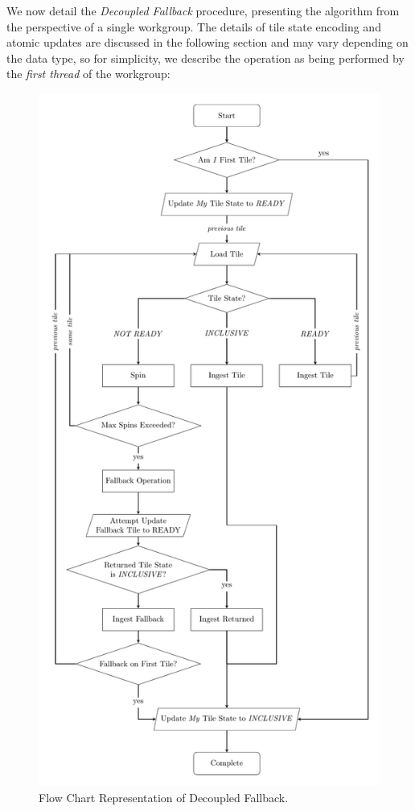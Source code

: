 \documentclass[acmsmall, manuscript, screen, review, anonymous]{acmart}
\begin{document}
We now detail the \emph{Decoupled Fallback} procedure, presenting the algorithm from the perspective of a single workgroup. The details of tile state encoding and atomic updates are discussed in the following section and may vary depending on the data type, so for simplicity, we describe the operation as being performed by the \emph{first thread} of the workgroup:
\begin{figure}
  \centering
  \includegraphics[height=\textheight]{graphics/FlowChart.pdf}
  \caption{Flow Chart Representation of Decoupled Fallback.\label{fig:decoupled_fallback}}
\end{figure}
\end{document}
